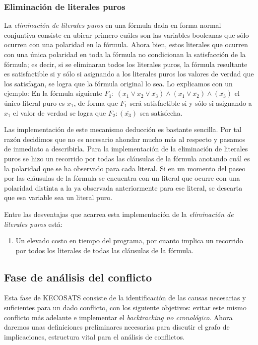 \documentclass[12pt,lettersize,oneside]{article}
\begin{document}
\subsubsection{Eliminación de literales puros}

La \emph{eliminación de literales puros} en una fórmula dada en forma normal
conjuntiva consiste en ubicar primero cuáles son las variables booleanas que
sólo ocurren con una polaridad en la fórmula. Ahora bien, estos literales que
ocurren con una única polaridad en toda la fórmula no condicionan la
satisfacción de la fórmula; es decir, si se eliminaran todos los literales
puros, la fórmula resultante es satisfactible si y sólo si asignando a los
literales puros los valores de verdad que los satisfagan, se logra que la
fórmula original lo sea. Lo explicamos con un ejemplo: En la fórmula siguiente
$F_1:\ (x_1 \vee x_2 \vee \overline{x_3}) \wedge (x_1 \vee \overline{x_2})
\wedge (\overline{x_3})$ el único literal puro es $x_1$, de forma que $F_1$ será
satisfactible si y sólo si asignando a $x_1$ el valor de verdad se logra que
$F_2:(\overline{x_3})$ sea satisfecha.

Las implementación de este mecanismo deducción es bastante sencilla. Por tal
razón decidimos que no es necesario ahondar mucho más al respecto y pasamos de
inmediato a describirla. Para la implementación de la eliminación de literales
puros se hizo un recorrido por todas las cláusulas de la fórmula anotando cuál
es la polaridad que se ha observado para cada literal. Si en un momento del
paseo por las cláusulas de la fórmula se encuentra con un literal que ocurre con
una polaridad distinta a la ya observada anteriormente para ese literal, se
descarta que esa variable sea un literal puro.

Entre las desventajas que acarrea esta implementación de la \emph{eliminación de
literales puros} está:\vspace{-2.5mm}
\begin{enumerate}
\item Un elevado costo en tiempo del programa, por cuanto implica un recorrido
  por todos los literales de todas las cláusulas de la fórmula.
\end{enumerate}\vspace{-2.5mm}
\subsection{Fase de análisis del conflicto}\label{analisisConflicto}

Esta fase de KECOSATS consiste de la identificación de las causas necesarias y
suficientes para un dado conflicto, con los siguiente objetivos: evitar este
mismo conflicto más adelante e implementar el \emph{backtracking no
  cronológico}.  Ahora daremos unas definiciones preliminares necesarias para
discutir el grafo de implicaciones, estructura vital para el análisis de
conflictos.
\end{document}
